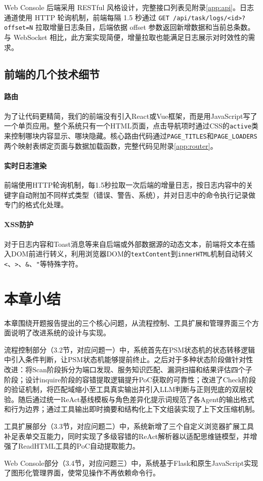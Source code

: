 Web Console 后端采用 RESTful 风格设计，完整接口列表见附录\ref{app:api}。日志通道使用 HTTP 轮询机制，前端每隔 1.5 秒通过 \texttt{GET /api/task/logs/<id>?offset=N} 拉取增量日志条目，后端依据 offset 参数返回新增数据和当前总条数。与 WebSocket 相比，此方案实现简便，增量拉取也能满足日志展示对时效性的需求。

\subsection{前端的几个技术细节}

\paragraph{路由}

为了让代码更精简，我们的前端没有引入React或Vue框架，而是用JavaScript写了一个单页应用。整个系统只有一个HTML页面，点击导航项时通过CSS的\texttt{active}类来控制哪块内容显示、哪块隐藏。核心路由代码通过\texttt{PAGE\_TITLES}和\texttt{PAGE\_LOADERS}两个映射表绑定页面与数据加载函数，完整代码见附录\ref{app:router}。

\paragraph{实时日志渲染}

前端使用HTTP轮询机制，每1.5秒拉取一次后端的增量日志，按日志内容中的关键字自动附加不同样式类型（错误、警告、系统），并对日志中的命令执行记录做专门的格式化处理。

\paragraph{XSS防护}

对于日志内容和Toast消息等来自后端或外部数据源的动态文本，前端将文本在插入DOM前进行转义，利用浏览器DOM的\texttt{textContent}到\texttt{innerHTML}机制自动转义\texttt{<}、\texttt{>}、\texttt{\&}、\texttt{"}等特殊字符。

\section{本章小结}

本章围绕开题报告提出的三个核心问题，从流程控制、工具扩展和管理界面三个方面说明了改进系统的设计与实现。

流程控制部分（3.2节，对应问题一）中，系统首先在PSM状态机的状态转移逻辑中引入条件判断，让PSM状态机能够提前终止。之后对于多种状态阶段做针对性改进：将Scan阶段拆分为端口发现、服务知识匹配、漏洞扫描和结果评估四个子阶段；设计inquire阶段的容错提取逻辑提升PoC获取的可靠性；改进了Check阶段的验证机制，将匹配域缩小至工具真实输出并引入LLM判断与正则兜底的双层校验。随后通过统一ReAct基线模板与角色差异化提示词规范了各Agent的输出格式和行为边界；通过工具输出即时摘要和结构化上下文组装实现了上下文压缩机制。

工具扩展部分（3.3节，对应问题二）中，系统新增了三个自定义浏览器扩展工具补足表单交互能力，同时实现了多级容错的ReAct解析器以适配思维链模型，并增强了ReadHTML工具的PoC自动提取能力。

Web Console部分（3.4节，对应问题三）中，系统基于Flask和原生JavaScript实现了图形化管理界面，使常见操作不再依赖命令行。

